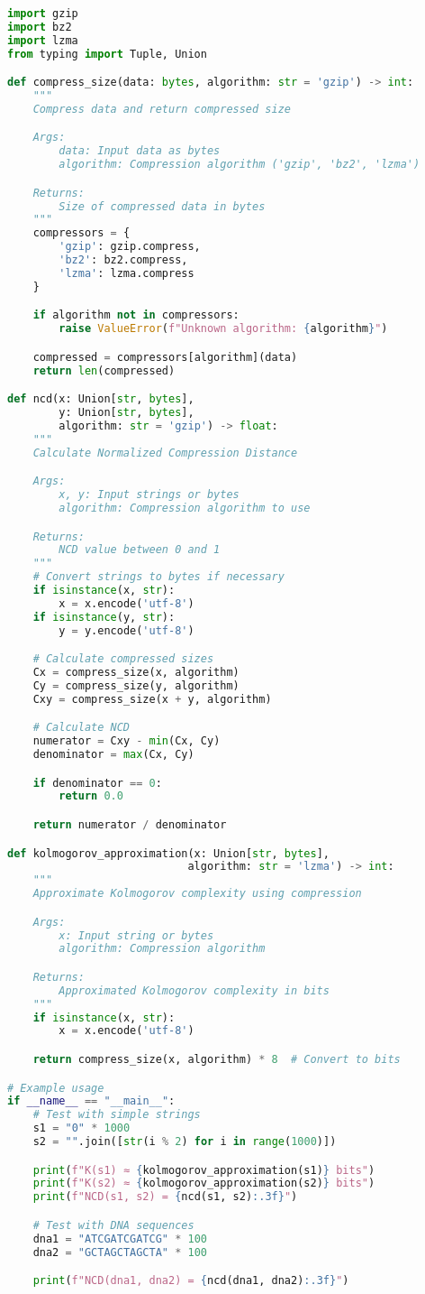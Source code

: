 \documentclass[12pt,a4paper]{report}
\begin{document}
\begin{lstlisting}[language=Python, caption=NCD Implementation]
import gzip
import bz2
import lzma
from typing import Tuple, Union

def compress_size(data: bytes, algorithm: str = 'gzip') -> int:
    """
    Compress data and return compressed size

    Args:
        data: Input data as bytes
        algorithm: Compression algorithm ('gzip', 'bz2', 'lzma')

    Returns:
        Size of compressed data in bytes
    """
    compressors = {
        'gzip': gzip.compress,
        'bz2': bz2.compress,
        'lzma': lzma.compress
    }

    if algorithm not in compressors:
        raise ValueError(f"Unknown algorithm: {algorithm}")

    compressed = compressors[algorithm](data)
    return len(compressed)

def ncd(x: Union[str, bytes],
        y: Union[str, bytes],
        algorithm: str = 'gzip') -> float:
    """
    Calculate Normalized Compression Distance

    Args:
        x, y: Input strings or bytes
        algorithm: Compression algorithm to use

    Returns:
        NCD value between 0 and 1
    """
    # Convert strings to bytes if necessary
    if isinstance(x, str):
        x = x.encode('utf-8')
    if isinstance(y, str):
        y = y.encode('utf-8')

    # Calculate compressed sizes
    Cx = compress_size(x, algorithm)
    Cy = compress_size(y, algorithm)
    Cxy = compress_size(x + y, algorithm)

    # Calculate NCD
    numerator = Cxy - min(Cx, Cy)
    denominator = max(Cx, Cy)

    if denominator == 0:
        return 0.0

    return numerator / denominator

def kolmogorov_approximation(x: Union[str, bytes],
                            algorithm: str = 'lzma') -> int:
    """
    Approximate Kolmogorov complexity using compression

    Args:
        x: Input string or bytes
        algorithm: Compression algorithm

    Returns:
        Approximated Kolmogorov complexity in bits
    """
    if isinstance(x, str):
        x = x.encode('utf-8')

    return compress_size(x, algorithm) * 8  # Convert to bits

# Example usage
if __name__ == "__main__":
    # Test with simple strings
    s1 = "0" * 1000
    s2 = "".join([str(i % 2) for i in range(1000)])

    print(f"K(s1) ≈ {kolmogorov_approximation(s1)} bits")
    print(f"K(s2) ≈ {kolmogorov_approximation(s2)} bits")
    print(f"NCD(s1, s2) = {ncd(s1, s2):.3f}")

    # Test with DNA sequences
    dna1 = "ATCGATCGATCG" * 100
    dna2 = "GCTAGCTAGCTA" * 100

    print(f"NCD(dna1, dna2) = {ncd(dna1, dna2):.3f}")
\end{lstlisting}
\end{document}
